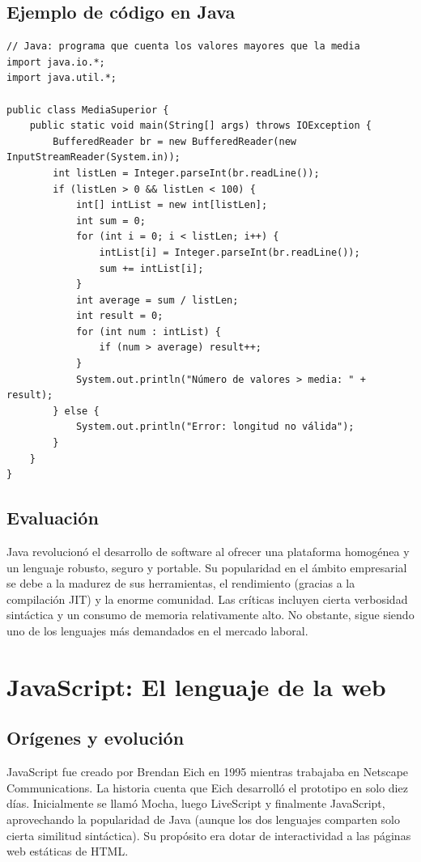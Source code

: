 \subsection{Ejemplo de código en Java}

\begin{verbatim}
// Java: programa que cuenta los valores mayores que la media
import java.io.*;
import java.util.*;

public class MediaSuperior {
    public static void main(String[] args) throws IOException {
        BufferedReader br = new BufferedReader(new InputStreamReader(System.in));
        int listLen = Integer.parseInt(br.readLine());
        if (listLen > 0 && listLen < 100) {
            int[] intList = new int[listLen];
            int sum = 0;
            for (int i = 0; i < listLen; i++) {
                intList[i] = Integer.parseInt(br.readLine());
                sum += intList[i];
            }
            int average = sum / listLen;
            int result = 0;
            for (int num : intList) {
                if (num > average) result++;
            }
            System.out.println("Número de valores > media: " + result);
        } else {
            System.out.println("Error: longitud no válida");
        }
    }
}
\end{verbatim}

\subsection{Evaluación}

Java revolucionó el desarrollo de software al ofrecer una plataforma homogénea y un lenguaje robusto, seguro y portable. Su popularidad en el ámbito empresarial se debe a la madurez de sus herramientas, el rendimiento (gracias a la compilación JIT) y la enorme comunidad. Las críticas incluyen cierta verbosidad sintáctica y un consumo de memoria relativamente alto. No obstante, sigue siendo uno de los lenguajes más demandados en el mercado laboral.

\section{JavaScript: El lenguaje de la web}

\subsection{Orígenes y evolución}

JavaScript fue creado por Brendan Eich en 1995 mientras trabajaba en Netscape Communications. La historia cuenta que Eich desarrolló el prototipo en solo diez días. Inicialmente se llamó Mocha, luego LiveScript y finalmente JavaScript, aprovechando la popularidad de Java (aunque los dos lenguajes comparten solo cierta similitud sintáctica). Su propósito era dotar de interactividad a las páginas web estáticas de HTML.

